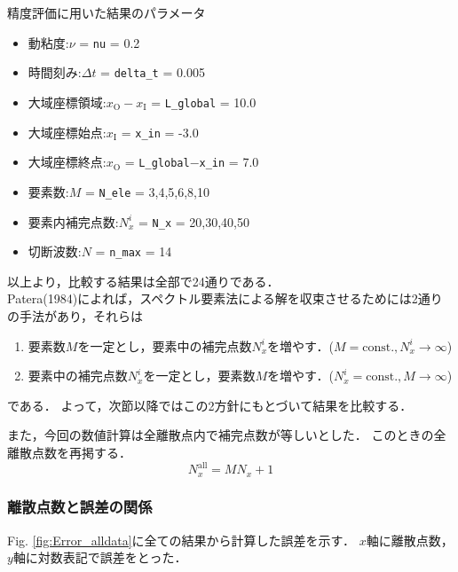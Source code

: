 \documentclass[12pt,a4paper]{jsarticle}
\begin{document}
\begin{itembox}[l]{精度評価に用いた結果のパラメータ}
  \begin{itemize}
    \item 動粘度:$\nu$ = \texttt{nu} = 0.2
    \item 時間刻み:$\Delta t$ = \texttt{delta\_t} = 0.005
    \item 大域座標領域:$x_{\text{O}}-x_{\text{I}}$ = \texttt{L\_global} = 10.0
    \item 大域座標始点:$x_{\text{I}}$ = \texttt{x\_in} = -3.0
    \item 大域座標終点:$x_{\text{O}}$ = \texttt{L\_global}$-$\texttt{x\_in} = 7.0
    \item 要素数:$M$ = \texttt{N\_ele} = 3,4,5,6,8,10
    \item 要素内補完点数:$N_{x}^i$ = \texttt{N\_x} = 20,30,40,50
    \item 切断波数:$N$ = \texttt{n\_max} = 14
  \end{itemize}
\end{itembox}

以上より，比較する結果は全部で24通りである．\\

Patera(1984)によれば，スペクトル要素法による解を収束させるためには2通りの手法があり，それらは
\begin{enumerate}
  \item 要素数$M$を一定とし，要素中の補完点数$N_{x}^i$を増やす．($M=\text{const.}, N_{x}^i \to \infty$)
  \item 要素中の補完点数$N_{x}^i$を一定とし，要素数$M$を増やす．($N_{x}^i=\text{const.}, M \to \infty$)
\end{enumerate}
である．
よって，次節以降ではこの2方針にもとづいて結果を比較する．


また，今回の数値計算は全離散点内で補完点数が等しいとした．
このときの全離散点数を再掲する．
\begin{equation*}
  N_{x}^\text{all} = M N_{x} +1
\end{equation*}

\subsubsection{離散点数と誤差の関係}
\label{subsubsec:TotalInterpolant_Error}

Fig. \ref{fig:Error_alldata}に全ての結果から計算した誤差を示す．
$x$軸に離散点数，$y$軸に対数表記で誤差をとった．
\end{document}
